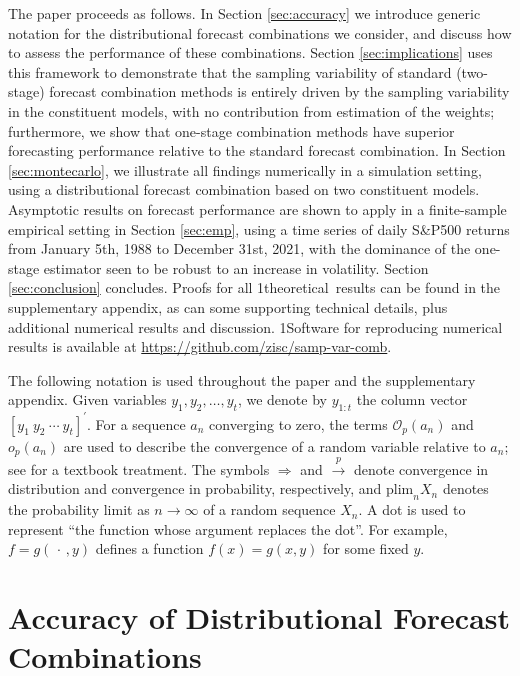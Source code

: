 \documentclass[12pt]{article}
\newcommand{\blind}{1}
\theoremstyle{definition}
\theoremstyle{remark}
\begin{document}
{The paper proceeds as follows. In Section \ref{sec:accuracy} we introduce generic notation for the distributional forecast combinations we consider, and discuss how to assess the performance of these combinations. Section \ref{sec:implications} uses this framework to demonstrate that the sampling variability of standard (two-stage) forecast combination methods is entirely driven by the sampling variability in the constituent models, with no contribution from estimation of the weights; furthermore, we show that one-stage combination methods have superior forecasting performance relative to the standard forecast combination. In Section \ref{sec:montecarlo}, we illustrate all findings numerically in a simulation setting, using a distributional forecast combination based on two constituent models. Asymptotic results on forecast performance are shown to apply in a finite-sample empirical setting in Section \ref{sec:emp}, using a time series of daily S\&P500 returns from January 5th, 1988 to December 31st, 2021, with the dominance of the one-stage estimator seen to be robust to an increase in volatility. Section \ref{sec:conclusion} concludes. Proofs for all \blind{theoretical\ }\fi results can be found in the supplementary appendix, as can some supporting technical details, plus additional numerical results and discussion. \blind{Software for reproducing numerical results is available at \href{https://github.com/zisc/samp-var-comb}{https://github.com/zisc/samp-var-comb}.}\fi

The following notation is used throughout the paper and the supplementary appendix. Given variables $y_{1},y_{2},\ldots ,y_{t}$, we denote by $y_{1:t}$ the column vector $[y_{1}\ y_{2}\ \cdots \ y_{t}]^{\prime }$. For a sequence $a_{n}$ converging to zero, the terms $\mathcal{O}_{p}(a_{n})$ and $o_{p}(a_{n})$ are used to describe the convergence of a random variable relative to $a_{n}$; see \cite{VanDerVaart1998} for a textbook treatment. The symbols $\Rightarrow $ and $\overset{p}{\rightarrow }$ denote convergence in distribution and convergence in probability, respectively, and $\mathrm{plim}_n X_n$ denotes the probability limit as $n \to \infty$ of a random sequence $X_n$. A dot is used to represent \textquotedblleft the function whose argument replaces the dot\textquotedblright . For example, $f=g(\,\cdot \,,y)$ defines a function $f(x)=g(x,y)$ for some fixed $y$.

\section{Accuracy of Distributional Forecast Combinations\label{sec:accuracy}}

}
\end{document}
